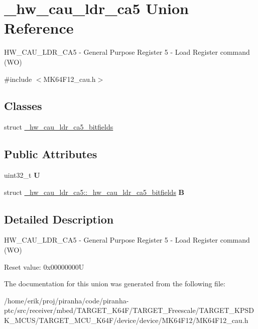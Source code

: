 \hypertarget{union__hw__cau__ldr__ca5}{}\section{\+\_\+hw\+\_\+cau\+\_\+ldr\+\_\+ca5 Union Reference}
\label{union__hw__cau__ldr__ca5}


H\+W\+\_\+\+C\+A\+U\+\_\+\+L\+D\+R\+\_\+\+C\+A5 -\/ General Purpose Register 5 -\/ Load Register command (WO)  




{\ttfamily \#include $<$M\+K64\+F12\+\_\+cau.\+h$>$}

\subsection*{Classes}
\begin{DoxyCompactItemize}
\item 
struct \hyperlink{struct__hw__cau__ldr__ca5_1_1__hw__cau__ldr__ca5__bitfields}{\+\_\+hw\+\_\+cau\+\_\+ldr\+\_\+ca5\+\_\+bitfields}
\end{DoxyCompactItemize}
\subsection*{Public Attributes}
\begin{DoxyCompactItemize}
\item 
uint32\+\_\+t {\bfseries U}\hypertarget{union__hw__cau__ldr__ca5_ac52db74775872f7c88fb39ed1ab55ae3}{}\label{union__hw__cau__ldr__ca5_ac52db74775872f7c88fb39ed1ab55ae3}

\item 
struct \hyperlink{struct__hw__cau__ldr__ca5_1_1__hw__cau__ldr__ca5__bitfields}{\+\_\+hw\+\_\+cau\+\_\+ldr\+\_\+ca5\+::\+\_\+hw\+\_\+cau\+\_\+ldr\+\_\+ca5\+\_\+bitfields} {\bfseries B}\hypertarget{union__hw__cau__ldr__ca5_aa7e0b95967eab9cad83c15314c8e2fbb}{}\label{union__hw__cau__ldr__ca5_aa7e0b95967eab9cad83c15314c8e2fbb}

\end{DoxyCompactItemize}


\subsection{Detailed Description}
H\+W\+\_\+\+C\+A\+U\+\_\+\+L\+D\+R\+\_\+\+C\+A5 -\/ General Purpose Register 5 -\/ Load Register command (WO) 

Reset value\+: 0x00000000U 

The documentation for this union was generated from the following file\+:\begin{DoxyCompactItemize}
\item 
/home/erik/proj/piranha/code/piranha-\/ptc/src/receiver/mbed/\+T\+A\+R\+G\+E\+T\+\_\+\+K64\+F/\+T\+A\+R\+G\+E\+T\+\_\+\+Freescale/\+T\+A\+R\+G\+E\+T\+\_\+\+K\+P\+S\+D\+K\+\_\+\+M\+C\+U\+S/\+T\+A\+R\+G\+E\+T\+\_\+\+M\+C\+U\+\_\+\+K64\+F/device/device/\+M\+K64\+F12/M\+K64\+F12\+\_\+cau.\+h\end{DoxyCompactItemize}
